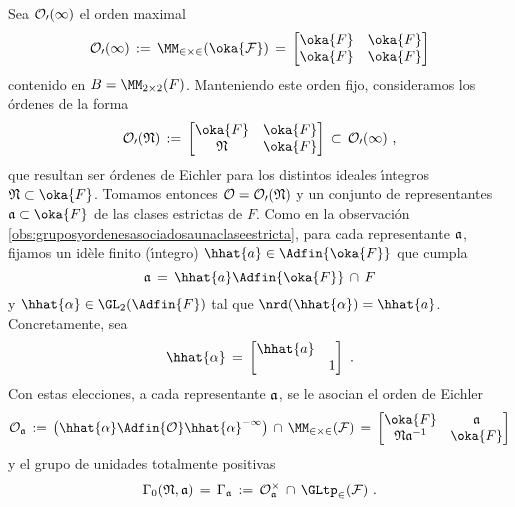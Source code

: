 Sea $\cal{O}_{0}(1)$ el orden maximal
\begin{equation}
	\label{eq:ordenmaximalmatrices}
	\cal{O}_{0}(1) \,:=\, \MM_{2\times 2}(\oka{F}) \,=\,
	\begin{bmatrix} \oka{F} & \oka{F} \\ \oka{F} & \oka{F} \end{bmatrix}
\end{equation}
%
contenido en $B=\MM_{2\times 2}(F)$. Manteniendo este orden fijo,
consideramos los \'{o}rdenes de la forma
\begin{equation}
	\label{eq:ordendeeichlermatrices}
	\cal{O}_{0}(\frak{N}) \,:=\,
	\begin{bmatrix} \oka{F} & \oka{F} \\ \frak{N} & \oka{F} \end{bmatrix}
		\,\subset\,\cal{O}_{0}(1)
		\text{ ,}
\end{equation}
%
que resultan ser \'{o}rdenes de Eichler para los distintos ideales
\'{\i}ntegros $\frak{N}\subset\oka{F}$. Tomamos entonces
$\cal{O}=\cal{O}_{0}(\frak{N})$ y un conjunto de representantes
$\frak{a}\subset\oka{F}$ de las clases estrictas de $F$. Como en la
observaci\'{o}n \ref{obs:gruposyordenesasociadosaunaclaseestricta}, para cada
representante $\frak{a}$, fijamos un id\`{e}le finito (\'{\i}ntegro)
$\hhat{a}\in\Adfin{\oka{F}}$ que cumpla
\begin{equation}
	\label{eq:ideleintegroasociadomatrices}
	\frak{a} \,=\,\hhat{a}\Adfin{\oka{F}}\,\cap\,F
\end{equation}
y $\hhat{\alpha}\in\GL_{2}(\Adfin{F})$ tal que $\nrd(\hhat{\alpha})=\hhat{a}$.
Concretamente, sea
\begin{equation}
	\label{eq:matrizasociadaaideleintegromatrices}
	\hhat{\alpha} \,=\,\begin{bmatrix} \hhat{a} & \\ & 1 \end{bmatrix}
	\text{ .}
\end{equation}
%
Con estas elecciones, a cada representante $\frak{a}$, se le asocian el orden
de Eichler
\begin{equation}
	\label{eq:ordenasociadomatrices}
	\cal{O}_{\frak{a}} \,:=\,\big(\hhat{\alpha}\Adfin{\cal{O}}
			\hhat{\alpha}^{-1}\big)\,\cap\,\MM_{2\times 2}(F)
		\,=\,\begin{bmatrix} \oka{F} & \frak{a} \\
			\frak{N}\frak{a}^{-1} & \oka{F}\end{bmatrix}
\end{equation}
%
y el grupo de unidades totalmente positivas
\begin{equation}
	\label{eq:unidadestotalmentepositivasasociadasmatrices}
	\Gamma_{0}(\frak{N},\frak{a}) \,=\,
		\Gamma_{\frak{a}} \,:=\,\cal{O}_{\frak{a}}^{\times}\,\cap\,
				\GLtp_{2}(F)
	\text{ .}
\end{equation}
%

